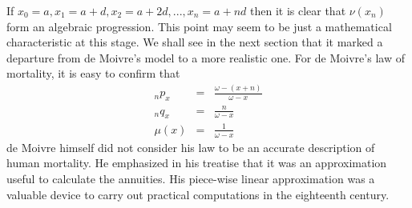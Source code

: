 \documentclass{article}
\numberwithin{equation}{section}
\begin{document}
If $x_0 = a, x_1 = a + d, x_2 = a + 2d, ..., x_n = a + nd$ then it is clear 
that $\nu(x_n)$ form an algebraic progression. This point may seem to be just a 
mathematical characteristic at this stage. We shall see in the next section that
it marked a departure from de Moivre's model to a more realistic one. For de 
Moivre's law of mortality, it is easy to confirm that
\begin{eqnarray}
{}_np_x &=& \frac{\omega - (x + n)}{\omega - x} \label{s1e6} \\
{}_nq_x &=& \frac{n}{\omega - x} \label{s1e7} \\
\mu(x) &=& \frac{1}{\omega - x} \label{s1e8}
\end{eqnarray}
de Moivre himself did not consider his law to be an accurate description of
human mortality. He emphasized in his treatise that it was an approximation
useful to calculate the annuities. His piece-wise linear approximation was a
valuable device to carry out practical computations in the eighteenth century.
\end{document}
